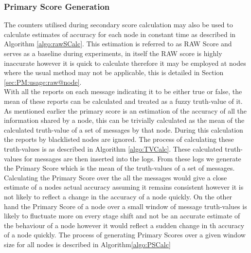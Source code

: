 \documentclass[journal]{IEEEtran}
\begin{document}
\subsubsection{Primary Score Generation}
The counters utilised during secondary score calculation may also be used to calculate estimates of accuracy for each node in constant time as described in %
Algorithm \ref{algo:rawSCalc}. This estimation is referred to as RAW Score and serves as a baseline during experiments, in itself the RAW score is highly inaccurate however it is quick to calculate therefore it may be employed at nodes where the usual method may not be applicable, this is detailed in Section \ref{sec:PM:usage:raw@node}.\\
With all the reports on each message indicating it to be either true or false, the mean of these reports can be calculated and treated as a fuzzy truth-value of it. As mentioned earlier the primary score is an estimation of the accuracy of all the information shared by a node, this can be trivially calculated as the mean of the calculated truth-value of a set of messages by that node. During this calculation the reports by blacklisted nodes are ignored. The process of calculating these truth-values is as described in %
Algorithm \ref{algo:TVCalc}. These calculated truth-values for messages are then inserted into the logs. From these logs we generate the Primary Score which is the mean of the truth-values of a set of messages. Calculating the Primary Score over the all the messages would give a close estimate of a nodes actual accuracy assuming it remains consistent however it is not likely to reflect a change in the accuracy of a node quickly. On the other hand the Primary Score of a node over a small window of message truth-values is likely to fluctuate more on every stage shift and not be an accurate estimate of the behaviour of a node however it would reflect a sudden change in th accuracy of a node quickly. The process of generating Primary Scores over a given window size for all nodes is described in %
Algorithm\ref{algo:PSCalc}
\end{document}
